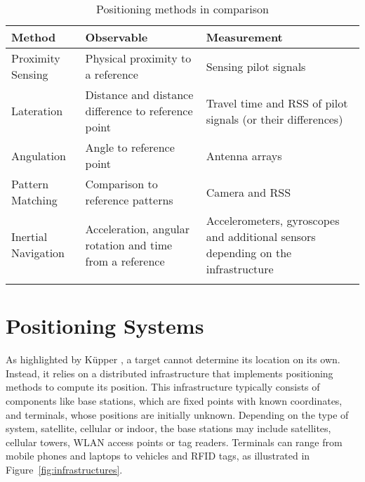 \begin{table}[h!]
    \begin{center}
    \caption{Positioning methods in comparison}
    \label{tab:table_methods}
    \begin{tabular}{>{\centering\arraybackslash}p{4cm} >{\centering\arraybackslash}p{4cm} >{\centering\arraybackslash}p{5cm}}
        \toprule
        \textbf{Method} & \textbf{Observable} & \textbf{Measurement} \\
        \midrule
        Proximity Sensing & Physical proximity to a reference & Sensing pilot signals \\
        \addlinespace
        \hline
        \addlinespace
        Lateration & Distance and distance difference to reference point & Travel time and \acs{RSS} of pilot signals (or their differences) \\
        \addlinespace
        \hline
        \addlinespace
        Angulation & Angle to reference point & Antenna arrays \\
        \addlinespace
        \hline
        \addlinespace
        Pattern Matching & Comparison to reference patterns & Camera and \acs{RSS} \\
        \addlinespace
        \hline
        \addlinespace
        Inertial Navigation & Acceleration, angular rotation and time from a reference & Accelerometers, gyroscopes and additional sensors depending on the infrastructure \\
        \addlinespace
        \bottomrule
    \end{tabular}
    \end{center}
\end{table}

\section{Positioning Systems}
As highlighted by K\"upper \cite{kupper2005location}, a target cannot determine its location on its own. 
Instead, it relies on a distributed infrastructure that implements positioning methods to compute its position. 
This infrastructure typically consists of components like base stations, which are fixed points with known coordinates, and terminals, whose positions are initially unknown. 
Depending on the type of system, satellite, cellular or indoor, the base stations may include satellites, cellular towers, \ac{WLAN} access points or tag readers.
Terminals can range from mobile phones and laptops to vehicles and \ac{RFID} tags, as illustrated in Figure~\ref{fig:infrastructures}.

